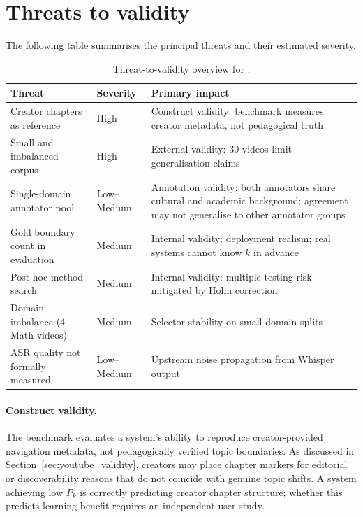 \section{Threats to validity}
\label{sec:threats_validity}

The following table summarises the principal threats and their estimated
severity.

\begin{table}[h]
  \centering
  \caption{Threat-to-validity overview for \lecseg{}.}
  \label{tab:threats}
  \small
  \begin{tabular}{p{4.5cm}lp{5.5cm}}
    \toprule
    Threat & Severity & Primary impact \\
    \midrule
    Creator chapters as reference & High & Construct validity:
      benchmark measures creator metadata, not pedagogical truth \\
    Small and imbalanced corpus & High & External validity:
      30 videos limit generalisation claims \\
    Single-domain annotator pool & Low--Medium & Annotation validity:
      both annotators share cultural and academic background; agreement
      may not generalise to other annotator groups \\
    Gold boundary count in evaluation & Medium & Internal validity:
      deployment realism; real systems cannot know $k$ in advance \\
    Post-hoc method search & Medium & Internal validity:
      multiple testing risk mitigated by Holm correction \\
    Domain imbalance (4 Math videos) & Medium & Selector stability on
      small domain splits \\
    ASR quality not formally measured & Low--Medium & Upstream noise
      propagation from Whisper output \\
    \bottomrule
  \end{tabular}
\end{table}

\paragraph{Construct validity.}
The benchmark evaluates a system's ability to reproduce creator-provided
navigation metadata, not pedagogically verified topic boundaries.
As discussed in Section~\ref{sec:youtube_validity}, creators may place chapter
markers for editorial or discoverability reasons that do not coincide with
genuine topic shifts.
A system achieving low $P_k$ is correctly predicting creator chapter structure;
whether this predicts learning benefit requires an independent user study.

